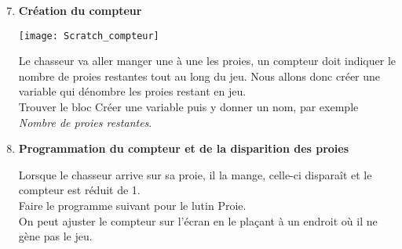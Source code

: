       \begin{enumerate}
      \setcounter{enumi}{6}
         \item {\bf Création du compteur} \pfh{} \\
            \hspace*{0.5cm}
            \begin{minipage}{4.5cm}
               {\blue \texttt{[image: Scratch\_compteur]}} \medskip
            \end{minipage}
            \qquad
            \begin{minipage}{10cm}
               Le chasseur va aller manger une à une les proies, un compteur doit indiquer le nombre de proies restantes tout au long du jeu. Nous allons donc créer une variable qui dénombre les proies restant en jeu. \\
               Trouver le bloc \textcolor{B1}{Créer une variable} puis y donner un nom, par exemple {\it Nombre de proies restantes}.
            \end{minipage}

         \item {\bf Programmation du compteur et de la disparition des proies} \pfh{} \\
            \begin{minipage}{9cm}
               Lorsque le chasseur arrive sur sa proie, il la mange, celle-ci disparaît et le compteur est réduit de 1. \\
               Faire le programme suivant pour le lutin \textcolor{B1}{Proie}. \\
               On peut ajuster le compteur sur l'écran en le plaçant à un endroit où il ne gène pas le jeu.
            \end{minipage}
            \qquad
            \begin{minipage}{7cm}
               \begin{scratch}
                     {
                        {
                        }
                     }
               \end{scratch}
            \end{minipage}
    

\end{enumerate}
